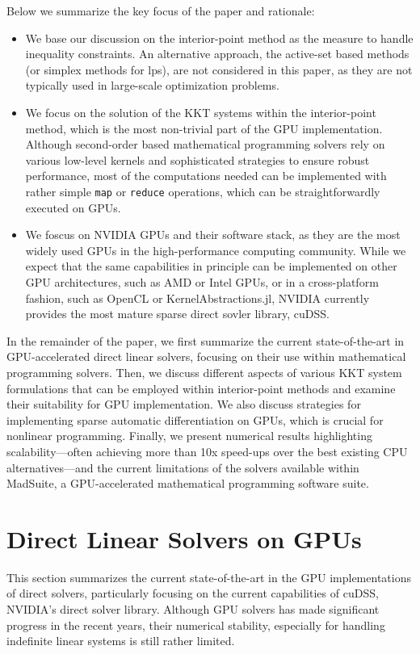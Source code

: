 \documentclass{article}
\begin{document}
Below we summarize the key focus of the paper and rationale:
\begin{itemize}[leftmargin=*,itemsep=0pt,parsep=0pt,partopsep=0pt]
\item We base our discussion on the interior-point method as the measure to handle inequality constraints. An alternative approach, the active-set based methods (or simplex methods for \glspl*{lp}), are not considered in this paper, as they are not typically used in large-scale optimization problems. 
\item We focus on the solution of the KKT systems within the interior-point method, which is the most non-trivial part of the GPU implementation. Although second-order based mathematical programming solvers rely on various low-level kernels and sophisticated strategies to ensure robust performance, most of the computations needed can be implemented with rather simple \texttt{map} or \texttt{reduce} operations, which can be straightforwardly executed on GPUs. 
\item We foscus on NVIDIA GPUs and their software stack, as they are the most widely used GPUs in the high-performance computing community. While we expect that the same capabilities in principle can be implemented on other GPU architectures, such as AMD or Intel GPUs, or in a cross-platform fashion, such as OpenCL or KernelAbstractions.jl, NVIDIA currently provides the most mature sparse direct sovler library, cuDSS.
\end{itemize}
In the remainder of the paper, we first summarize the current state-of-the-art in GPU-accelerated direct linear solvers, focusing on their use within mathematical programming solvers.
Then, we discuss different aspects of various KKT system formulations that can be employed within interior-point methods and examine their suitability for GPU implementation.
We also discuss strategies for implementing sparse automatic differentiation on GPUs, which is crucial for nonlinear programming.
Finally, we present numerical results highlighting scalability---often achieving more than 10x speed-ups over the best existing CPU alternatives---and the current limitations of the solvers available within MadSuite, a GPU-accelerated mathematical programming software suite.

\section{Direct Linear Solvers on GPUs}\label{eqn:linear}
This section summarizes the current state-of-the-art in the GPU implementations of direct solvers, particularly focusing on the current capabilities of cuDSS, NVIDIA's direct solver library.
Although GPU solvers has made significant progress in the recent years, their numerical stability, especially for handling indefinite linear systems is still rather limited.
\end{document}
